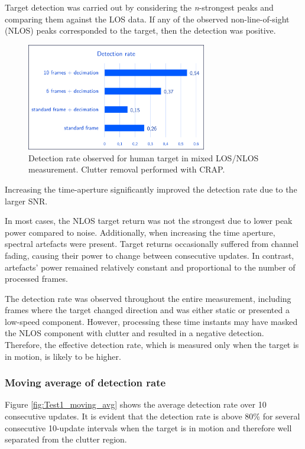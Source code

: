 Target detection was carried out by considering the \textit{n}-strongest peaks and comparing them against the LOS data. If any of the observed non-line-of-sight (NLOS) peaks corresponded to the target, then the detection was positive.

\begin{figure}[H]
	\centering
	\includegraphics[width=0.7\textwidth]{Images/Test1/detect_hist/detect_hist_human_LMsans.png}
	\caption{Detection rate observed for human target in mixed LOS/NLOS measurement. Clutter removal performed with CRAP.}
	\label{fig:Test1_detect_hist}
\end{figure}

Increasing the time-aperture significantly improved the detection rate due to the larger SNR.

In most cases, the NLOS target return was not the strongest due to lower peak power compared to noise. Additionally, when increasing the time aperture, spectral artefacts were present.
Target returns occasionally suffered from channel fading, causing their power to change between consecutive updates. In contrast, artefacts' power remained relatively constant and proportional to the number of processed frames.

The detection rate was observed throughout the entire measurement, including frames where the target changed direction and was either static or presented a low-speed component. However, processing these time instants may have masked the NLOS component with clutter and resulted in a negative detection. Therefore, the effective detection rate, which is measured only when the target is in motion, is likely to be higher.


\subsubsection{Moving average of detection rate}

Figure \ref{fig:Test1_moving_avg} shows the average detection rate over 10 consecutive updates. It is evident that the detection rate is above 80\% for several consecutive 10-update intervals when the target is in motion and therefore well separated from the clutter region.


